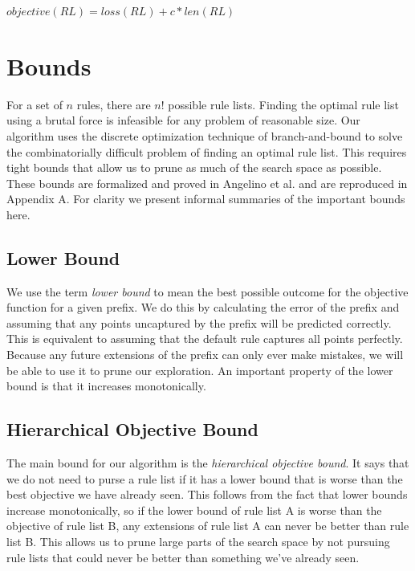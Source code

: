 \documentclass[]{report}
\theoremstyle{definition}
\begin{document}
\begin{math}
objective(RL) = loss(RL) + c * len(RL)
\end{math}

\section{Bounds}\label{sec:bounds}
For a set of $n$ rules, there are $n!$ possible rule lists.
Finding the optimal rule list using a brutal force is infeasible for any problem of reasonable size.
Our algorithm uses the discrete optimization technique of branch-and-bound to solve the combinatorially difficult problem of finding an optimal rule list.
This requires tight bounds that allow us to prune as much of the search space as possible.
These bounds are formalized and proved in Angelino et al. \cite{AngelinoLaAlSeRu17} and are reproduced in Appendix A.
For clarity we present informal summaries of the important bounds here.

\subsection{Lower Bound}
We use the term \textit{lower bound} to mean the best possible outcome for the objective function for a given prefix.
We do this by calculating the error of the prefix and assuming that any points uncaptured by the prefix will be predicted correctly.
This is equivalent to assuming that the default rule captures all points perfectly.
Because any future extensions of the prefix can only ever make mistakes, we will be able to use it to prune our exploration.
An important property of the lower bound is that it increases monotonically.

\subsection{Hierarchical Objective Bound}
The main bound for our algorithm is the \textit{hierarchical objective bound}. 
It says that we do not need to purse a rule list if it has a lower bound that is worse than the best objective we have already seen.
This follows from the fact that lower bounds increase monotonically, so if the lower bound of rule list A is worse than the objective of rule list B, any extensions of rule list A can never be better than rule list B.
This allows us to prune large parts of the search space by not pursuing rule lists that could never be better than something we've already seen.
\end{document}
